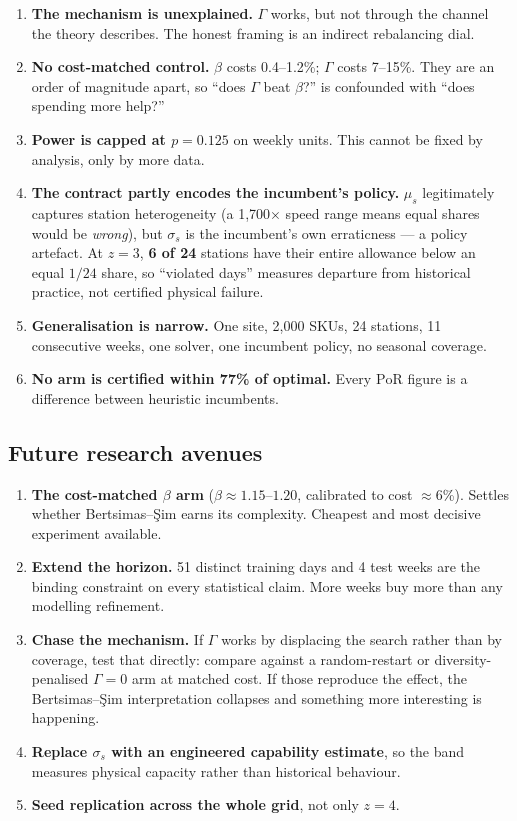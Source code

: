 \documentclass[11pt,a4paper]{article}
\newcommand{\PoR}{\mathrm{PoR}}
\begin{document}
\begin{enumerate}
  \item \textbf{The mechanism is unexplained.} $\Gamma$ works, but not through
        the channel the theory describes. The honest framing is an indirect
        rebalancing dial.
  \item \textbf{No cost-matched control.} $\beta$ costs 0.4--1.2\%; $\Gamma$
        costs 7--15\%. They are an order of magnitude apart, so ``does $\Gamma$
        beat $\beta$?'' is confounded with ``does spending more help?''
  \item \textbf{Power is capped at $p=0.125$} on weekly units. This cannot be
        fixed by analysis, only by more data.
  \item \textbf{The contract partly encodes the incumbent's policy.} $\mu_s$
        legitimately captures station heterogeneity (a 1{,}700$\times$ speed
        range means equal shares would be \emph{wrong}), but $\sigma_s$ is the
        incumbent's own erraticness --- a policy artefact. At $z=3$,
        \textbf{6 of 24} stations have their entire allowance below an equal
        $1/24$ share, so ``violated days'' measures departure from historical
        practice, not certified physical failure.
  \item \textbf{Generalisation is narrow.} One site, 2{,}000 SKUs, 24 stations,
        11 consecutive weeks, one solver, one incumbent policy, no seasonal
        coverage.
  \item \textbf{No arm is certified within 77\% of optimal.} Every $\PoR$ figure
        is a difference between heuristic incumbents.
\end{enumerate}

\subsection{Future research avenues}

\begin{enumerate}
  \item \textbf{The cost-matched $\beta$ arm} ($\beta\approx1.15$--$1.20$,
        calibrated to cost $\approx$6\%). Settles whether Bertsimas--\c{S}im
        earns its complexity. Cheapest and most decisive experiment available.
  \item \textbf{Extend the horizon.} 51 distinct training days and 4 test weeks
        are the binding constraint on every statistical claim. More weeks buy
        more than any modelling refinement.
  \item \textbf{Chase the mechanism.} If $\Gamma$ works by displacing the search
        rather than by coverage, test that directly: compare against a
        random-restart or diversity-penalised $\Gamma=0$ arm at matched cost. If
        those reproduce the effect, the Bertsimas--\c{S}im interpretation
        collapses and something more interesting is happening.
  \item \textbf{Replace $\sigma_s$ with an engineered capability estimate}, so
        the band measures physical capacity rather than historical behaviour.
  \item \textbf{Seed replication across the whole grid}, not only $z=4$.
\end{enumerate}
\end{document}
